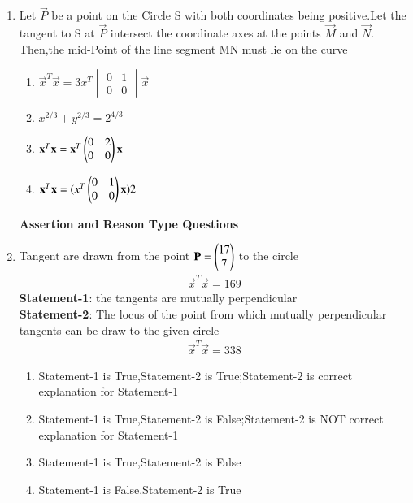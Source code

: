 \begin{enumerate}[label=\arabic*.,ref=\thesubsection.\theenumi]
\item Let $\vec{P}$ be a point on the Circle S with both coordinates being positive.Let the tangent to S at $\vec{P}$ intersect the coordinate axes at the points $\vec{M}$ and $\vec{N}.$ Then,the mid-Point of the line segment MN must lie on the curve
\begin{enumerate}
\item $\vec x^T \vec x=3 x^T \begin{vmatrix} 0 & 1 \\ 0 & 0  \end{vmatrix}\vec x$
\item $x^{2/3}+y^{2/3}=2^{4/3}$
\item $\mathbf x^T \mathbf x=\mathbf x^T \begin{pmatrix}0 & 2 \\ 0 & 0\end{pmatrix}  \mathbf x$
\item $\mathbf x^T \mathbf x=(x^T \begin{pmatrix}0 & 1 \\ 0 & 0\end{pmatrix}\mathbf{x})2$
\end{enumerate}


\textbf{Assertion and Reason Type Questions}
\item Tangent are drawn from the point $\mathbf{P}=\begin{pmatrix}17\\7\end{pmatrix}$ to the circle
\begin{align}
\vec x^T \vec x=169
\end{align}
\textbf{Statement-1}: the tangents are mutually perpendicular\\
\textbf{Statement-2}: The locus of the point from which mutually perpendicular tangents can be draw to the given circle
\begin{align}
\vec x^T\vec x=338
\end{align}
\begin{enumerate}
\item Statement-1 is True,Statement-2 is True;Statement-2 is correct explanation for Statement-1
\item Statement-1 is True,Statement-2 is False;Statement-2 is NOT correct explanation for Statement-1
\item Statement-1 is True,Statement-2 is False 
\item Statement-1 is False,Statement-2 is True
\end{enumerate}


\end{enumerate}

